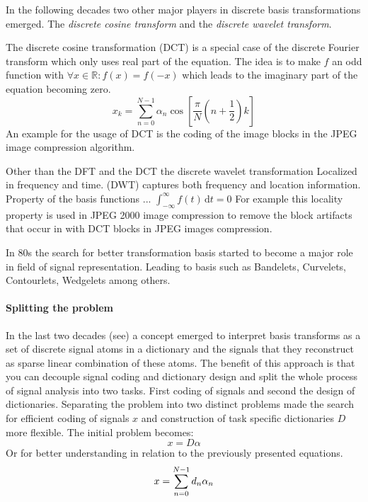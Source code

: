 In the following decades two other major players in discrete basis
transformations emerged. The \emph{discrete cosine transform} and the
\emph{discrete wavelet transform}. 

The discrete cosine transformation (DCT) is a special case of the discrete
Fourier transform which only uses real part of the equation. The idea is to make
$f$ an odd function with $\forall x \in \mathbb{R} : f(x) = f(-x)$ which leads
to the imaginary part of the equation becoming zero.
\begin{equation*}
x_k = \sum_{n=0}^{N-1}\alpha_n\cos \left[ \frac{\pi}{N} \left(
n+\frac{1}{2}\right) k\right]
\end{equation*}
An example for the usage of DCT is the coding of the image blocks in the
JPEG image compression algorithm.

Other than the DFT and the DCT the discrete wavelet transformation
Localized in frequency and time. 
(DWT) captures both frequency and location information. 
 Property of the basis functions ...
$\int_{-\infty}^{\infty} \! f(t) \, \mathrm{d}t = 0$
For example this locality property is used in JPEG 2000 image compression to
remove the block artifacts that occur in with DCT blocks in JPEG images
compression. 

In 80s the search for better transformation basis started to become a major role
in field of signal representation. Leading to basis such as Bandelets,
Curvelets, Contourlets, Wedgelets among others.

\paragraph{Splitting the problem}
\cite{Rubinstein2010}
In the last two decades (see\cite{Olshausen1996,Mallat1993}) a concept emerged
to interpret basis transforms as a set of discrete signal atoms in a dictionary
and the signals that they reconstruct as sparse linear combination of these
atoms. The benefit of this approach is that you can decouple signal coding and
dictionary design and split the whole process of signal analysis into two tasks.
First coding of signals and second the design of dictionaries. Separating the
problem into two distinct problems made the search for efficient coding of
signals $x$ and construction of task specific dictionaries $D$ more
flexible. The initial problem becomes:
\begin{equation}
 x  = D\alpha
\end{equation}
Or for better understanding in relation to the previously presented
equations.
\begin{equation}
x = \sum_{n=0}^{N-1}d_n\alpha_n\notag
\end{equation}

